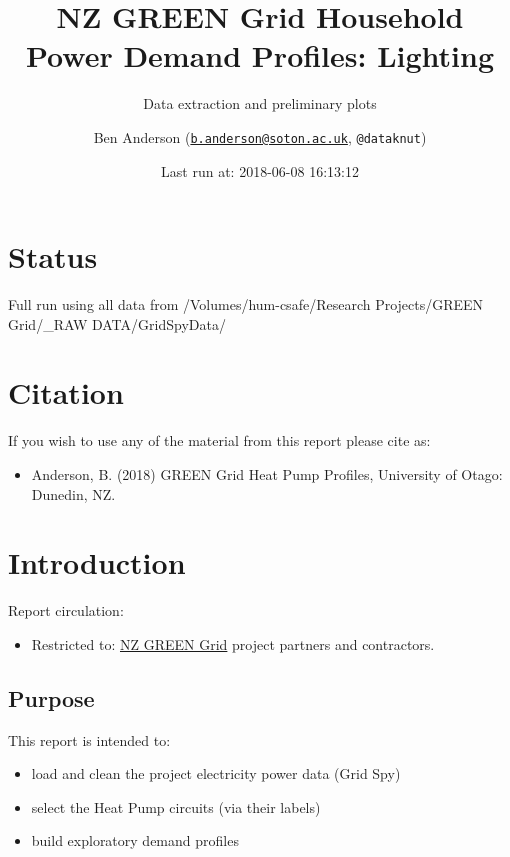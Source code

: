 \documentclass[]{article}
\title{NZ GREEN Grid Household Power Demand Profiles: Lighting}
\subtitle{Data extraction and preliminary plots}
\author{Ben Anderson
(\href{mailto:b.anderson@soton.ac.uk}{\nolinkurl{b.anderson@soton.ac.uk}},
\texttt{@dataknut})}
\date{Last run at: 2018-06-08 16:13:12}
\providecommand{\tightlist}{%
  \setlength{\itemsep}{0pt}\setlength{\parskip}{0pt}}
\begin{document}
\maketitle

{
\setcounter{tocdepth}{2}
\tableofcontents
}
\newpage

\section{Status}\label{status}

Full run using all data from /Volumes/hum-csafe/Research Projects/GREEN
Grid/\_RAW DATA/GridSpyData/

\section{Citation}\label{citation}

If you wish to use any of the material from this report please cite as:

\begin{itemize}
\tightlist
\item
  Anderson, B. (2018) GREEN Grid Heat Pump Profiles, University of
  Otago: Dunedin, NZ.
\end{itemize}

\newpage

\section{Introduction}\label{introduction}

Report circulation:

\begin{itemize}
\tightlist
\item
  Restricted to:
  \href{https://www.otago.ac.nz/centre-sustainability/research/energy/otago050285.html}{NZ
  GREEN Grid} project partners and contractors.
\end{itemize}

\subsection{Purpose}\label{purpose}

This report is intended to:

\begin{itemize}
\tightlist
\item
  load and clean the project electricity power data (Grid Spy)
\item
  select the Heat Pump circuits (via their labels)
\item
  build exploratory demand profiles
\end{itemize}
\end{document}
